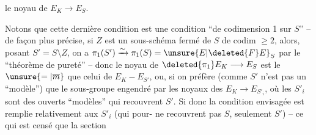 le noyau de $E_K\longrightarrow E_S$.

Notons que cette dernière condition est une condition ``de codimension 1 sur $S$'' -- de façon plus précise, si $Z$ est un sous-schéma fermé de $S$ de codim $\geq 2$,  alors, posant $S'=S\setminus Z$, on a $\pi_1(S')\xrightarrow{\sim}\pi_1(S)=\unsure{E|\deleted{F}E}_S$ par le ``théorème de pureté'' -- donc le noyau de $\deleted{\pi_1}E_K\longrightarrow E_S$ est le $\unsure{=|\overline{m}}$ que celui de $E_K-E_{S'}$, ou, si on préfère (comme $S'$ n'est pas un ``modèle'') que le sous-groupe  engendré par les noyaux des $E_K\longrightarrow E_{S'_i}$, où les $S'_i$ sont des ouverts ``modèles'' qui recouvrent $S'$. Si donc la condition envisagée est remplie relativement aux $S'_i$ (qui pour- ne recouvrent pas $S$, seulement $S'$) -- ce qui est censé  que la section
